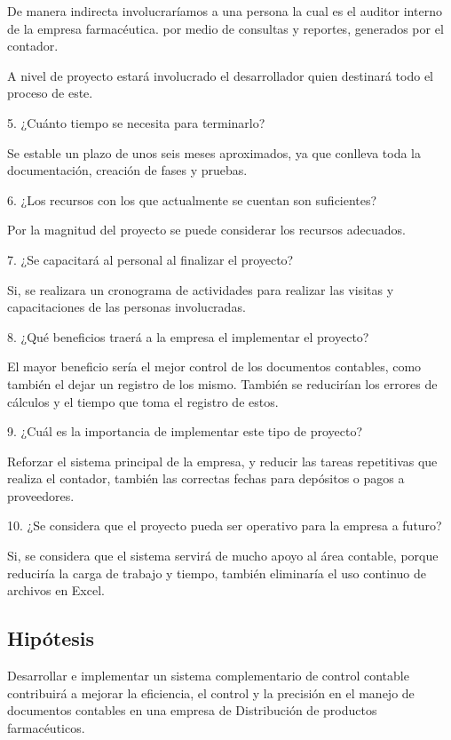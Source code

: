 De manera indirecta involucraríamos a una persona la cual es el auditor interno de la empresa farmacéutica. por medio de consultas y reportes, generados por el contador.

A nivel de proyecto estará involucrado el desarrollador quien destinará todo el proceso de este.

5. ¿Cuánto tiempo se necesita para terminarlo?

Se estable un plazo de unos seis meses aproximados, ya que conlleva toda la documentación, creación de fases y pruebas.

6. ¿Los recursos con los que actualmente se cuentan son suficientes?

Por la magnitud del proyecto se puede considerar los recursos adecuados.

7. ¿Se capacitará al personal al finalizar el proyecto?

Si, se realizara un cronograma de actividades para realizar las visitas y capacitaciones de las personas involucradas.

8. ¿Qué beneficios traerá a la empresa el implementar el proyecto?

El mayor beneficio sería el mejor control de los documentos contables, como también el dejar un registro de los mismo. También se reducirían los errores de cálculos y el tiempo que toma el registro de estos.

9. ¿Cuál es la importancia de implementar este tipo de proyecto?

Reforzar el sistema principal de la empresa, y reducir las tareas repetitivas que realiza el contador, también las correctas fechas para depósitos o pagos a proveedores.

10. ¿Se considera que el proyecto pueda ser operativo para la empresa a futuro?

Si, se considera que el sistema servirá de mucho apoyo al área contable, porque reduciría la carga de trabajo y tiempo, también eliminaría el uso continuo de archivos en Excel.

\subsection{Hipótesis}

Desarrollar e implementar un sistema complementario de control contable contribuirá a mejorar la eficiencia, el control y la precisión en el manejo de documentos contables en una empresa de Distribución de productos farmacéuticos.